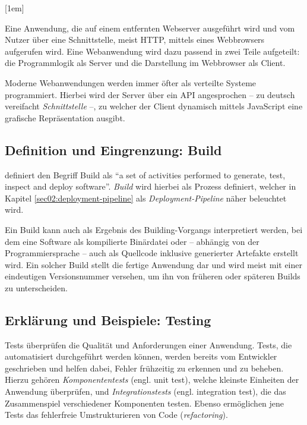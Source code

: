 [1em]

Eine Anwendung, die auf einem entfernten Webserver ausgeführt wird und vom Nutzer über eine Schnittstelle, meist \ac{HTTP}, mittels eines Webbrowsers aufgerufen wird. Eine Webanwendung wird dazu passend in zwei Teile aufgeteilt: die Programmlogik als Server und die Darstellung im Webbrowser als Client.

Moderne Webanwendungen werden immer öfter als verteilte Systeme programmiert. Hierbei wird der Server über ein \ac{API} angesprochen – zu deutsch vereifacht \emph{Schnittstelle} –, zu welcher der Client dynamisch mittels JavaScript eine grafische Repräsentation ausgibt.


\subsection{Definition und Eingrenzung: Build} \label{ssec02:build}

\citet[27]{Duvall2007} definiert den Begriff Build als ``a set of activities performed to generate, test, inspect and deploy software''. \emph{Build} wird hierbei als Prozess definiert, welcher in Kapitel \ref{sec02:deployment-pipeline} als \emph{Deployment-Pipeline} näher beleuchtet wird.

Ein Build kann auch als Ergebnis des Building-Vorgangs interpretiert werden, bei dem eine Software als kompilierte Binärdatei oder – abhängig von der Programmiersprache – auch als Quellcode inklusive generierter Artefakte erstellt wird. Ein solcher Build stellt die fertige Anwendung dar und wird meist mit einer eindeutigen Versionsnummer versehen, um ihn von früheren oder späteren Builds zu unterscheiden.

\subsection{Erklärung und Beispiele: Testing}

Tests überprüfen die Qualität und Anforderungen einer Anwendung. Tests, die automatisiert durchgeführt werden können, werden bereits vom Entwickler geschrieben und helfen dabei, Fehler frühzeitig zu erkennen und zu beheben. Hierzu gehören \emph{Komponententests} (engl. unit test), welche kleinste Einheiten der Anwendung überprüfen, und \emph{Integrationstests} (engl. integration test), die das Zusammenspiel verschiedener Komponenten testen. Ebenso ermöglichen jene Tests das fehlerfreie Umstrukturieren von Code (\emph{refactoring}). \citep[104f]{Wolff2016}

